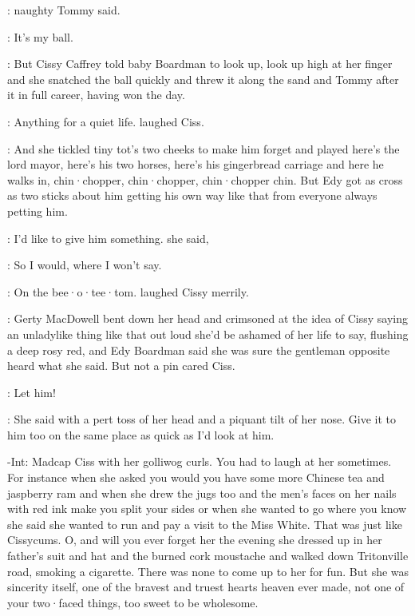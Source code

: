 :
naughty Tommy said.

\tommy:
It's my ball.

:
But Cissy Caffrey told baby Boardman to look up,
look up high at her finger
and she snatched the ball quickly
and threw it along the sand
and Tommy after it in full career,
having won the day.

\cissy:
Anything for a quiet life.
laughed Ciss.

:
And she tickled tiny tot's two cheeks
to make him forget
and played
here's the lord mayor,
here's his two horses,
here's his gingerbread carriage
and here he walks in,
chin·chopper,
chin·chopper,
chin·chopper chin.
But Edy
got as cross as two sticks
about him getting his own way like that
from everyone always petting him.

\edy:
I'd like to give him something.
she said,

\edy:
So I would,
where I won't say.

\cissy:
On the bee·o·tee·tom.
laughed Cissy merrily.

:
Gerty MacDowell bent down her head
and crimsoned at the idea
of Cissy saying an unladylike thing like that out loud
she'd be ashamed of her life to say,
flushing a deep rosy red,
and Edy Boardman said
she was sure the gentleman opposite
heard what she said.
But not a pin
cared Ciss.

\cissy:
Let him!

:
She said
with a pert toss of her head
and a piquant tilt of her nose.
Give it to him too
on the same place
as quick as I'd look at him.

\gerty-Int:
Madcap Ciss with her golliwog curls.
You had to laugh at her sometimes.
For instance
when she asked you
would you have some more Chinese tea and jaspberry ram
and when she drew the jugs too
and the men's
faces on her nails
with red ink
make you split your sides
or when she wanted to go where you know
she said
she wanted to run and pay a visit to the Miss White.
That was just like Cissycums.
O,
and will you ever forget her
the evening she dressed up
in her father's suit and hat and the burned cork moustache
and walked down Tritonville road,
smoking a cigarette.
There was none to come up to her for fun.
But she was sincerity itself,
one of the bravest and truest hearts heaven ever made,
not one of your two·faced things,
too sweet to be wholesome.

